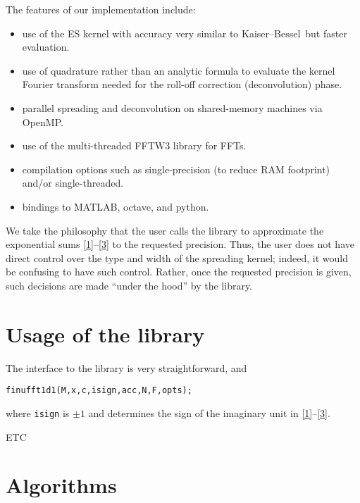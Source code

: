 \documentclass[10pt]{article}
\newcommand{\bi}{\begin{itemize}}
\newcommand{\ei}{\end{itemize}}
\newcommand{\KB}{Kaiser--Bessel}
\begin{document}
The features of our implementation include:
\bi
\item use of the ES kernel with accuracy very similar to \KB\ but
  faster evaluation.
\item use of quadrature rather than an analytic formula to evaluate
  the kernel Fourier transform needed for the roll-off correction
  (deconvolution) phase.
\item parallel spreading and deconvolution on shared-memory machines via OpenMP.
\item use of the multi-threaded FFTW3 library for FFTs.
\item compilation options such as single-precision (to reduce RAM footprint)
  and/or single-threaded.
\item bindings to MATLAB, octave, and python.
\ei

We take the philosophy that the user calls the library to approximate the
exponential sums \eqref{1}--\eqref{3} to the requested precision.
Thus, the user does not have direct control over the type and width of
the spreading kernel; indeed, it would be confusing to have such control.
Rather, once the requested precision is given, such decisions
are made ``under the hood'' by the library.





\section{Usage of the library}

The interface to the library is very straightforward,
and 


\begin{verbatim}
finufft1d1(M,x,c,isign,acc,N,F,opts);
\end{verbatim}

where {\tt isign} is $\pm1$ and determines the sign of the imaginary
unit in \eqref{1}--\eqref{3}.

ETC



\section{Algorithms}
\end{document}
